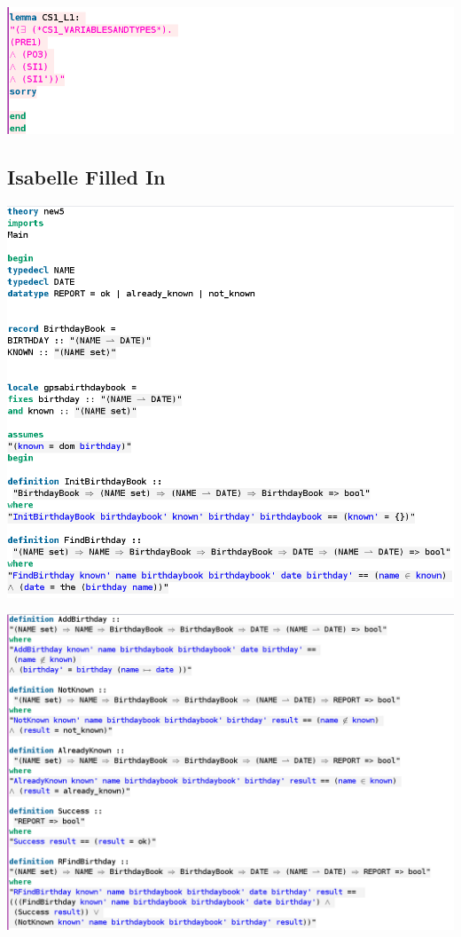 \noindent \includegraphics[scale=0.5]{examples/bb/4imagec.png}
%
\subsection{Isabelle Filled In}
\label{app:bb5}
\includegraphics[scale=0.4]{examples/bb/5imagea.png}

\noindent \includegraphics[scale=0.4]{examples/bb/5imageb.png}

